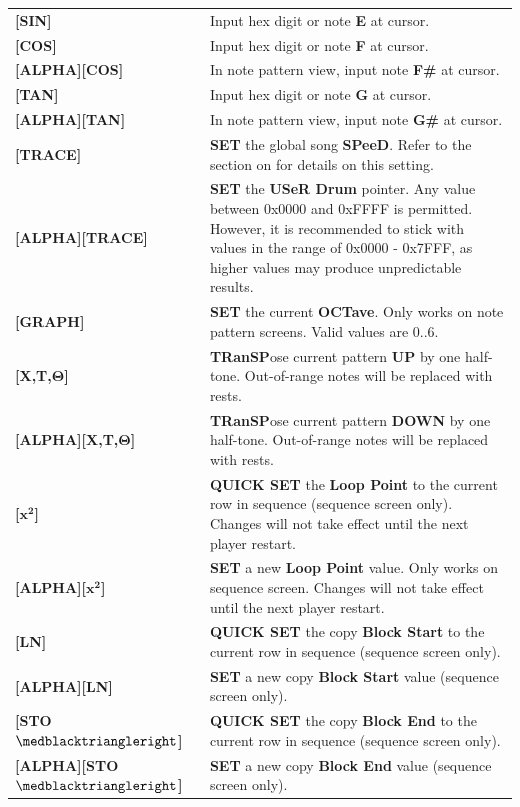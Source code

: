 \documentclass[12pt]{report}	%
\begin{document}
\begin{longtable}{p{} p{} }
\textbf{[SIN]} & Input hex digit or note \textbf{E} at cursor. \\
\textbf{[COS]} & Input hex digit or note \textbf{F} at cursor. \\
\textbf{[ALPHA][COS]} & In note pattern view, input note \textbf{F\#} at cursor. \\
\textbf{[TAN]} & Input hex digit or note \textbf{G} at cursor. \\
\textbf{[ALPHA][TAN]} & In note pattern view, input note \textbf{G\#} at cursor. \\
\hline
\textbf{[TRACE]} & \textbf{SET} the global song \textbf{SPeeD}. Refer to the section on \nameref{sec:globalvars} for details on this setting. \\
\textbf{[ALPHA][TRACE]} & \textbf{SET} the \textbf{USeR Drum} pointer. Any value between 0x0000 and 0xFFFF is permitted. However, it is recommended to stick with values in the range of 0x0000 - 0x7FFF, as higher values may produce unpredictable results. \\
\textbf{[GRAPH]} & \textbf{SET} the current \textbf{OCTave}. Only works on note pattern screens. Valid values are 0..6. \\
\hline
\textbf{[X,T,$\bm{\Theta}$]} & \textbf{TRanSP}ose current pattern \textbf{UP} by one half-tone. Out-of-range notes will be replaced with rests. \\
\textbf{[ALPHA][X,T,$\bm{\Theta}$]} & \textbf{TRanSP}ose current pattern \textbf{DOWN} by one half-tone. Out-of-range notes will be replaced with rests. \\
\hline
\textbf{[$\bm{x^2}$]} & \textbf{QUICK SET} the \textbf{Loop Point} to the current row in sequence (sequence screen only). Changes will not take effect until the next player restart. \\
\textbf{[ALPHA][$\bm{x^2}$]} & \textbf{SET} a new \textbf{Loop Point} value. Only works on sequence screen. Changes will not take effect until the next player restart. \\
\hline
\textbf{[LN]} & \textbf{QUICK SET} the copy \textbf{Block Start} to the current row in sequence (sequence screen only). \\
\textbf{[ALPHA][LN]} & \textbf{SET} a new copy \textbf{Block Start} value (sequence screen only). \\
\textbf{[STO\(\medblacktriangleright\)]} & \textbf{QUICK SET} the copy \textbf{Block End} to the current row in sequence (sequence screen only). \\
\textbf{[ALPHA][STO\(\medblacktriangleright\)]} & \textbf{SET} a new copy \textbf{Block End} value (sequence screen only). \\

\end{longtable}
\end{document}
